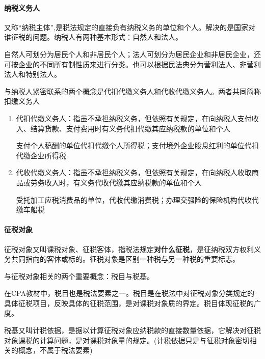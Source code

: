 \documentclass[UTF8,12pt]{ctexart}
\numberwithin{equation}{section} %
\numberwithin{figure}{section}
\numberwithin{table}{section}
\begin{document}
	\paragraph{纳税义务人}
	又称“纳税主体”,是税法规定的直接负有纳税义务的单位和个人。解决的是国家对谁征税的问题。纳税人有两种基本形式：自然人和法人。
	
	自然人可划分为居民个人和非居民个人；法人可划分为居民企业和非居民企业，还可按企业的不同所有制性质来进行分类。也可以根据民法典分为营利法人、非营利法人和特别法人。
	
	与纳税人紧密联系的两个概念是代扣代缴义务人和代收代缴义务人。两者共同简称扣缴义务人
	\begin{enumerate}
		\item 代扣代缴义务人：指虽不承担纳税义务，但依照有关规定，在向纳税人支付收入、结算货款、支付费用时有义务代扣代缴其应纳税款的单位和个人
		
		支付个人稿酬的单位代扣代缴个人所得税；支付境外企业股息红利的单位代扣代缴企业所得税
		
		\item 代收代缴义务人：指虽不承担纳税义务，但依照有关规定，在向纳税人收取商品或劳务收入时，有义务代收代缴其应纳税款的单位和个人
		
		受托加工应税消费品的单位，代收代缴消费税；办理交强险的保险机构代收代缴车船税
	\end{enumerate}
	
	\paragraph{征税对象}
	征税对象又叫课税对象、征税客体，指税法规定\textbf{对什么征税}，是征纳税双方权利义务共同指向的客体或标的。征税对象是区别一种税与另一种税的重要标志。
	
	与征税对象相关的两个重要概念：税目与税基。
	
	在CPA教材中，税目也是税法要素之一。税目是在税法中对征税对象分类规定的具体征税项目，反映具体的征税范围，是对课税对象质的界定。税目体现征税的广度。
	
	税基又叫计税依据，是据以计算征税对象应纳税款的直接数量依据，它解决对征税对象课税的计算问题，是对课税对象量的规定。(计税依据只是与征税对象密切相关的概念，不属于税法要素)
	
\end{document}
